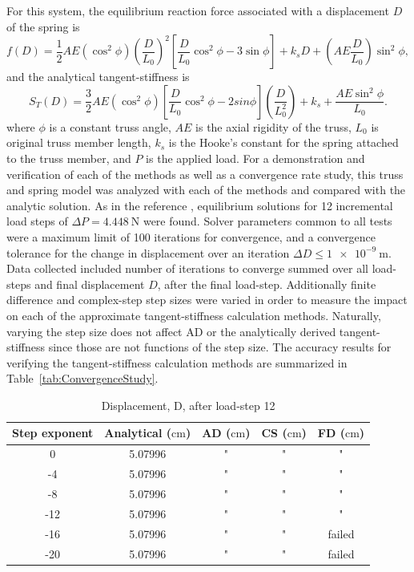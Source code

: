 \documentclass[preprint,12pt]{elsarticle}
\begin{document}
%
For this system, the equilibrium reaction force associated with a displacement $D$ of the spring is 
%
\begin{equation} 
    \label{eqn:TrussForce}
    f(D) = \frac 1 2 AE(\cos^{2}\phi)\left(\frac{D}{L_{0}}\right)^{2}\left[\frac{D}{L_{0}}\cos^{2}\phi - 3\sin\phi\right] + k_{s}D + \left(AE\frac{D}{L_{0}}\right)\sin^{2}\phi,
\end{equation} 
%
and the analytical tangent-stiffness is 
%
\begin{equation} 
    \label{eqn:TrussStiffness}
    S_{T}(D) = \frac 3 2 AE(\cos^{2}\phi)\left[\frac{D}{L_{0}}\cos^{2}\phi - 2sin\phi\right]\left(\frac{D}{L_{0}^{2}}\right) + k_{s} + \frac{AE\sin^{2}\phi}{L_{0}}.
\end{equation}
%
where $\phi$ is a constant truss angle, $AE$ is the axial rigidity of the truss, $L_{0}$ is original truss member length, $k_{s}$ is the Hooke's constant for the spring attached to the truss member, and $P$ is the applied load. For a demonstration and verification of each of the methods as well as a convergence rate study, this truss and spring model was analyzed with each of the methods and compared with the analytic solution. As in the reference \cite{rezaiee2010dynamic}, equilibrium solutions for 12 incremental load steps of $\Delta P=\SI{4.448}{\newton}$ were found. Solver parameters common to all tests were a maximum limit of 100 iterations for convergence, and a convergence tolerance for the change in displacement over an iteration $\Delta D \le \SI{1e-9}{\meter}$.  Data collected included number of iterations to converge summed over all load-steps and final displacement $D$, after the final load-step. Additionally finite difference and complex-step step sizes were varied in order to measure the impact on each of the approximate tangent-stiffness calculation methods. Naturally, varying the step size does not affect AD or the analytically derived tangent-stiffness since those are not functions of the step size. The accuracy results for verifying the tangent-stiffness calculation methods are summarized in Table~\ref{tab:ConvergenceStudy}. 
%
\begin{table}[tbp]    
  \centering
  \caption{Displacement, D, after load-step 12} \label{tab:Verification}   
        \begin{tabular}{c c c c c}
         \toprule
         Step exponent & Analytical ($\si{\centi\meter}$) & AD ($\si{\centi\meter}$) & CS ($\si{\centi\meter}$) & FD ($\si{\centi\meter}$)\\ 
        \midrule
        0 & 5.07996 & " & " & "\\
        -4 & 5.07996 & " & " & "\\
        -8 & 5.07996 & " & " & "\\
        -12 & 5.07996 & " & " & " \\
        -16 & 5.07996 & " & " & failed \\
        -20 & 5.07996 & " & " & failed \\
        \bottomrule
    \end{tabular}
\end{table}
\end{document}
